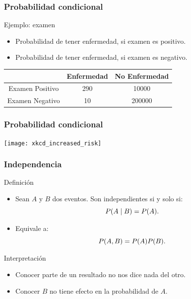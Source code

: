 \documentclass[table]{beamer}
\begin{document}
\begin{frame}
    \frametitle{Probabilidad condicional}
    \begin{block}{Ejemplo: examen}
        \begin{itemize}
            \item Probabilidad de tener enfermedad, si examen es positivo.
            \item Probabilidad de tener enfermedad, si examen es negativo.
        \end{itemize}
    \end{block}
    \begin{center}
        \begin{tabular}{c|cc}
            & Enfermedad & No Enfermedad \\
            \hline
            Examen Positivo & 290 & 10000 \\
            Examen Negativo & 10 & 200000 \\
        \end{tabular}
    \end{center}
\end{frame}

\begin{frame}
    \frametitle{Probabilidad condicional}
    \begin{center}
        \texttt{[image: xkcd\_increased\_risk]}
    \end{center}
\end{frame}

\begin{frame}
    \frametitle{Independencia}
    \begin{block}{Definición}
        \begin{itemize}
            \item Sean $A$ y $B$ dos eventos. Son independientes si y solo si:
                \begin{equation*}
                    \prob{A \mid B} = \prob{A} .
                \end{equation*}
            \item Equivale a:
                \begin{equation*}
                    \prob{A, B} = \prob{A} \prob{B} .
                \end{equation*}
        \end{itemize}
    \end{block}
    \begin{block}{Interpretación}
        \begin{itemize}
            \item Conocer parte de un resultado no nos dice nada del otro.
            \item Conocer $B$ no tiene efecto en la probabilidad de $A$.
        \end{itemize}
    \end{block}
\end{frame}
\end{document}
